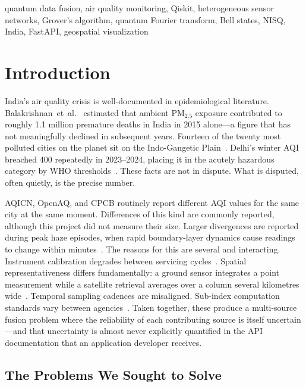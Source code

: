 \documentclass[conference]{IEEEtran}
\begin{document}
\begin{IEEEkeywords}
quantum data fusion, air quality monitoring, Qiskit, heterogeneous
sensor networks, Grover's algorithm, quantum Fourier transform,
Bell states, NISQ, India, FastAPI, geospatial visualization
\end{IEEEkeywords}


\section{Introduction}\label{sec:intro}

India's air quality crisis is well-documented in epidemiological
literature. Balakrishnan~et~al.~\cite{balakrishnan2019impact}
estimated that ambient PM$_{2.5}$ exposure contributed to roughly 1.1
million premature deaths in India in 2015 alone---a figure that has not
meaningfully declined in subsequent years.
Fourteen of the twenty most polluted cities on the planet sit on the
Indo-Gangetic Plain~\cite{who2021global}.
Delhi's winter AQI breached 400 repeatedly in 2023--2024, placing it in
the acutely hazardous category by WHO thresholds~\cite{who2021global}.
These facts are not in dispute.
What is disputed, often quietly, is the precise number.

AQICN, OpenAQ, and CPCB routinely report different AQI values for the
same city at the same moment.
Differences of this kind are commonly reported, although this project did
not measure their size.
Larger divergences are reported during peak haze episodes, when
rapid boundary-layer dynamics cause readings to change within
minutes~\cite{kumar2015rise}.
The reasons for this are several and interacting.
Instrument calibration degrades between servicing cycles~\cite{snyder2013changing}.
Spatial representativeness differs fundamentally: a ground sensor integrates
a point measurement while a satellite retrieval averages over a column several
kilometres wide~\cite{hammer2020global}.
Temporal sampling cadences are misaligned.
Sub-index computation standards vary between agencies~\cite{cpcb2014}.
Taken together, these produce a multi-source fusion problem where the
reliability of each contributing source is itself uncertain---and
that uncertainty is almost never explicitly quantified in the API
documentation that an application developer receives.

\subsection{The Problems We Sought to Solve}
\end{document}

